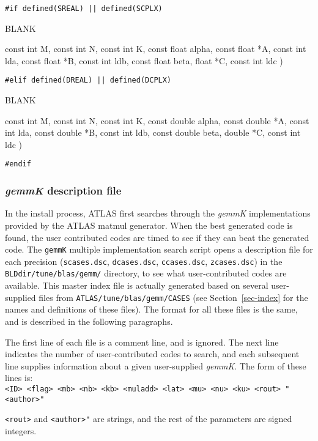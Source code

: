 \documentclass[11pt]{article}
\newenvironment{routdef}[1]
{
   \begin{list}{BLANK}
   {
      \setlength{\parsep}{0in}
      \setlength{\itemsep}{.01in}
      \setlength{\partopsep}{0in}
      \setlength{\topsep}{0.1in}
      \setlength{\labelsep}{0in}
      \setlength{\labelwidth}{#1in}
      \setlength{\leftmargin}{#1in}
   }
} {\end{list}}
\newcommand{\rditem}[2]{\item[#1\hfill(~]#2 )}
\begin{document}
\vspace*{.1in}

\noindent
\verb+#if defined(SREAL) || defined(SCPLX)+
\begin{routdef}{1.8}
\rditem{~~~void ATL\_USERMM}
{const int M, const int N, const int K, const float alpha, 
 const float *A, const int lda, const float *B, const int ldb, 
 const float beta, float *C, const int ldc}
\end{routdef}

\noindent
\verb+#elif defined(DREAL) || defined(DCPLX)+
\begin{routdef}{1.8}
\rditem{~~~void ATL\_USERMM}
{const int M, const int N, const int K, const double alpha, 
 const double *A, const int lda, const double *B, const int ldb, 
 const double beta, double *C, const int ldc}
\end{routdef}

\noindent
\verb+#endif+

\subsubsection{{\it gemmK} description file}
In the install process, ATLAS first searches through the {\it gemmK}
implementations provided by the ATLAS matmul generator.  When the
best generated code is found, the user contributed codes are timed
to see if they can beat the generated code.  The {\tt gemmK} multiple
implementation search
script opens a description file for each precision 
({\tt scases.dsc}, {\tt dcases.dsc}, {\tt ccases.dsc}, {\tt zcases.dsc})
in the {\tt BLDdir/tune/blas/gemm/} directory,
to see what user-contributed codes are available.  This master index
file is actually generated based on several user-supplied files from
{\tt ATLAS/tune/blas/gemm/CASES} (see Section~\ref{sec-index} for the
names and definitions of these files).  The format for all these files
is the same, and is described in the following paragraphs.

The first line of each file is a comment line, and is ignored.  The next
line indicates the number of user-contributed codes to search, and
each subsequent line supplies information about a given user-supplied
{\it gemmK}.  The form of these lines is:\\
\verb+<ID> <flag> <mb> <nb> <kb> <muladd> <lat> <mu> <nu> <ku> <rout> "<author>"+

\verb+<rout>+ and \verb+<author>"+ are strings, and the rest of the
parameters are signed integers.  
\end{document}
